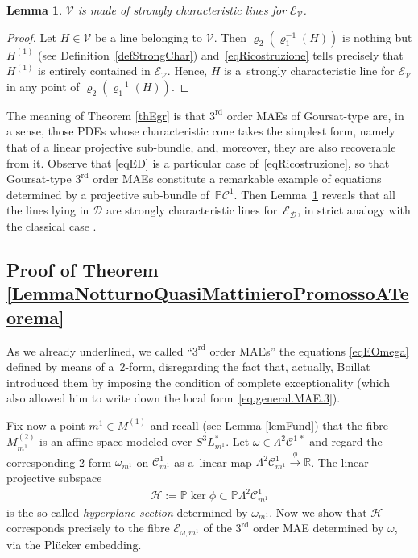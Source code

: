 \documentclass[10pt,a4paper]{amsart}
\newcommand{\R}{\mathbb{R}}
\newcommand{\C}{\mathcal{C}}
\newcommand{\D}{\mathcal{D}}
\newcommand{\M}{\mathcal{V}}
\newcommand{\E}{\mathcal{E}}
\renewcommand{\P}{\mathbb{P}}
\newcommand{\Rd}{^\textrm{rd}}
\newcommand{\p}{\varrho}
\numberwithin{equation}{section}
\newtheorem{Lemma}[Theorem]{Lemma}
\begin{document}
\begin{Lemma}\label{LemmuccioSimpatico}
 $\M$ is made of strongly characteristic lines for $\E_\M$.
\end{Lemma}
\begin{proof}
 Let $H\in \M$ be a line belonging to $\M$. Then $\p_2(\p_1^{-1}(H))$ is nothing but $H^{(1)}$ (see Def\/inition~\ref{defStrongChar}) and~\eqref{eqRicostruzione} tells precisely that $H^{(1)}$ is entirely contained in $\E_\M$. Hence, $H$ is a~strongly characteristic line for $\E_\M$ in any point of $\p_2(\p_1^{-1}(H))$.
\end{proof}

The meaning of Theorem \ref{thEgr} is that $3\Rd$ order MAEs of Goursat-type are, in a sense, those PDEs whose characteristic cone takes the simplest form, namely that of a linear projective sub-bundle, and, moreover, they are also recoverable from it.
Observe that \eqref{eqED} is a particular case of~\eqref{eqRicostruzione}, so that Goursat-type $3\Rd$ order MAEs constitute a remarkable example of equations determined by a projective sub-bundle of~$\P\C^1$. Then Lemma~\ref{LemmuccioSimpatico} reveals that all the lines lying in $\D$ are strongly characteristic lines for~$\E_\D$, in strict analogy with the classical case \cite{MR2985508}.

\subsection{Proof of Theorem \ref{LemmaNotturnoQuasiMattinieroPromossoATeorema}}

As we already underlined, we called ``$3\Rd$ order MAEs'' the equations \eqref{eqEOmega} def\/ined by means of a~2-form, disregarding the fact that, actually, Boillat introduced them by imposing the condition of complete exceptionality (which also allowed him to write down the local form~\eqref{eq.general.MAE.3}).

Fix now a point $m^1\in M^{(1)}$ and recall (see Lemma \ref{lemFund}) that the f\/ibre $M^{(2)}_{m^1}$ is an af\/f\/ine space modeled over $S^3L_{m^1}^\ast$. Let $\omega\in\Lambda^2\C^{1\,\ast}$ and regard the corresponding 2-form $\omega_{m^1}$ on $\C^1_{m^1}$ as a~linear map
$\Lambda^2\C^{1}_{m^1}\stackrel{\phi}{\longrightarrow} \R$.
The linear projective subspace
\begin{gather}\label{eqHypSec}
\mathcal{H}:=\P\ker\phi\subset \P \Lambda^2\C^{1}_{m^1}
\end{gather}
is the so-called \emph{hyperplane section} determined by $ \omega_{m^1}$. Now we show that $\mathcal{H}$ corresponds precisely to the f\/ibre $\E_{\omega, m^1}$ of the $3\Rd$ order MAE determined by $\omega$, via the Pl\"ucker embedding.
\end{document}
